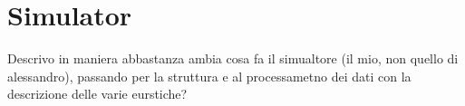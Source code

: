 
\chapter{Simulator}
\label{chap:4_simulator}
	\graphicspath{{Chapter4/}}


Descrivo in maniera abbastanza ambia cosa fa il simualtore (il mio, non quello di alessandro), passando per la struttura e al processametno dei dati con la descrizione delle varie eurstiche?

